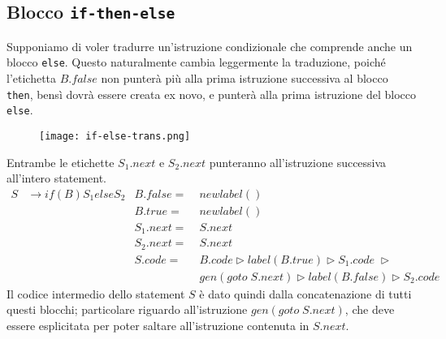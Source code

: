 \documentclass[class=book, crop=false, oneside, 12pt]{standalone}
\begin{document}
\subsection{Blocco \texttt{if-then-else}}
Supponiamo di voler tradurre un'istruzione condizionale che comprende anche un blocco \texttt{else}. Questo naturalmente cambia leggermente la traduzione, poiché l'etichetta \(B.false\) non punterà più alla prima istruzione successiva al blocco \texttt{then}, bensì dovrà essere creata ex novo, e punterà alla prima istruzione del blocco \texttt{else}.
\begin{figure}[H]
    \centering
    \texttt{[image: if-else-trans.png]}
    \caption{}
\end{figure}
Entrambe le etichette \(S_1.next\) e \(S_2.next\) punteranno all'istruzione successiva all'intero statement.
\begin{align*}
    S &\to if (B) S_1 else S_2 & B.false =\; &newlabel() \\
    & & B.true =\; &newlabel() \\
    & & S_1.next =\; &S.next \\
    & & S_2.next =\; &S.next \\
    & & S.code =\; &B.code \triangleright label(B.true) \triangleright S_1.code\; \triangleright \\
    & & &gen(goto\; S.next) \triangleright label(B.false) \triangleright S_2.code
\end{align*}
Il codice intermedio dello statement \(S\) è dato quindi dalla concatenazione di tutti questi blocchi; particolare riguardo all'istruzione \(gen(goto\; S.next)\), che deve essere esplicitata per poter saltare all'istruzione contenuta in \(S.next\).
\end{document}
